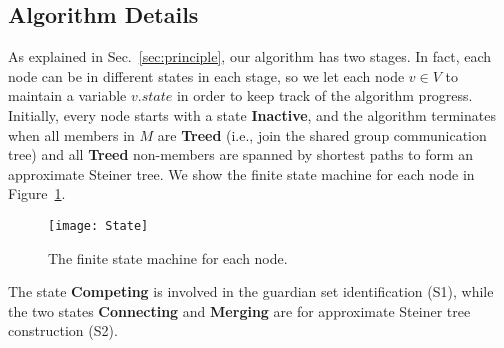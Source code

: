 \documentclass[10pt, conference, compsocconf]{IEEEtran}
\begin{document}
  \subsection{Algorithm Details}
As explained in Sec.~\ref{sec:principle}, our algorithm has two stages. In fact, each node can be in different states in each stage, so we let each node $v \in V$ to maintain a variable $v.\mathit{state}$ in order to keep track of the algorithm progress. Initially, every node starts with a state \textbf{Inactive}, and the algorithm terminates when all members in $M$ are \textbf{Treed} (i.e., join the shared group communication tree) and all \textbf{Treed} non-members are spanned by shortest paths to form an approximate Steiner tree. We show the finite state machine for each node in Figure~\ref{fig:state}.
\begin{figure}[htbp]
      \centerline{\texttt{[image: State]}}
      \caption{The finite state machine for each node.}
      \label{fig:state}
    \end{figure}
The state \textbf{Competing} is involved in the guardian set identification (S1), while the two states \textbf{Connecting} and \textbf{Merging} are for approximate Steiner tree construction (S2).
\end{document}
